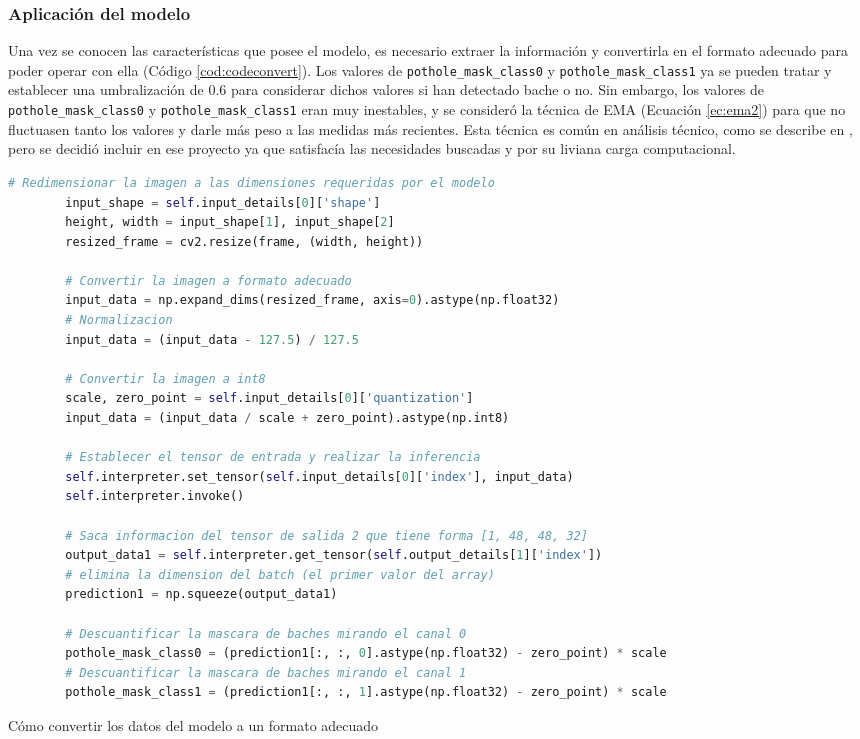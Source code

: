 \subsubsection{Aplicación del modelo}
\label{subsec:aplicacionmodelo}

Una vez se conocen las características que posee el modelo, es necesario extraer la información y convertirla en el formato adecuado para poder operar con ella (Código \ref{cod:codeconvert}). Los valores de \verb|pothole_mask_class0| y \verb|pothole_mask_class1| ya se pueden tratar y establecer una umbralización de 0.6 para considerar dichos valores si han detectado bache o no. Sin embargo, los valores de \verb|pothole_mask_class0| y \verb|pothole_mask_class1| eran muy inestables, y se consideró la técnica de \ac{EMA} (Ecuación \ref{ec:ema2}) para que no fluctuasen tanto los valores y darle más peso a las medidas más recientes. Esta técnica es común en análisis técnico, como se describe en \cite{6708545}, pero se decidió incluir en ese proyecto ya que satisfacía las necesidades buscadas y por su liviana carga computacional.

\begin{code}[h]
	\begin{lstlisting}[language=Python]
		# Redimensionar la imagen a las dimensiones requeridas por el modelo
		input_shape = self.input_details[0]['shape']
		height, width = input_shape[1], input_shape[2]
		resized_frame = cv2.resize(frame, (width, height))
		
		# Convertir la imagen a formato adecuado
		input_data = np.expand_dims(resized_frame, axis=0).astype(np.float32)
		# Normalizacion 
		input_data = (input_data - 127.5) / 127.5 
		
		# Convertir la imagen a int8
		scale, zero_point = self.input_details[0]['quantization']
		input_data = (input_data / scale + zero_point).astype(np.int8)
		
		# Establecer el tensor de entrada y realizar la inferencia
		self.interpreter.set_tensor(self.input_details[0]['index'], input_data)
		self.interpreter.invoke()
		
		# Saca informacion del tensor de salida 2 que tiene forma [1, 48, 48, 32] 
		output_data1 = self.interpreter.get_tensor(self.output_details[1]['index'])
		# elimina la dimension del batch (el primer valor del array)
		prediction1 = np.squeeze(output_data1)
		
		# Descuantificar la mascara de baches mirando el canal 0
		pothole_mask_class0 = (prediction1[:, :, 0].astype(np.float32) - zero_point) * scale
		# Descuantificar la mascara de baches mirando el canal 1
		pothole_mask_class1 = (prediction1[:, :, 1].astype(np.float32) - zero_point) * scale
	\end{lstlisting}
	\caption[Cómo convertir los datos del modelo a un formato adecuado]{Cómo convertir los datos del modelo a un formato adecuado}
	\label{cod:codeconvert}
\end{code}

